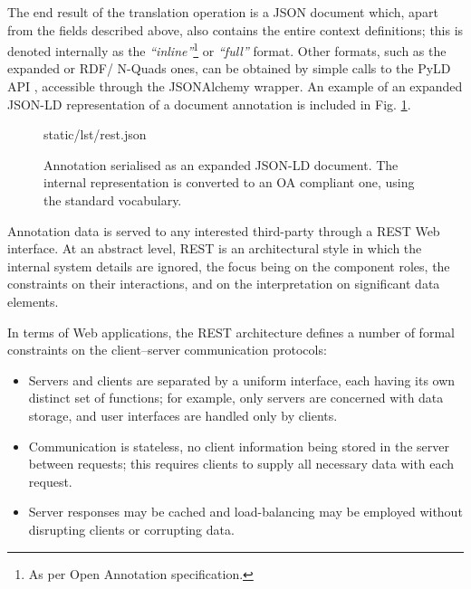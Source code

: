 The end result of the translation operation is a JSON document which, apart
from the fields described above, also contains the entire context definitions;
this is denoted internally as the \textit{``inline''}\footnote{As per Open
Annotation specification.} or \textit{``full''} format. Other formats, such
as the expanded or RDF/ N-Quads ones, can be obtained by simple calls to the
PyLD API \cite{ref:pyld}, accessible through the JSONAlchemy wrapper. An example
of an expanded JSON-LD representation of a document annotation is included in
Fig.  \ref{lst:annojson}.

\begin{figure}[!ht]
  
    {static/lst/rest.json}
    \caption[Annotation serialised as an expanded JSON-LD document]
            {Annotation serialised as an expanded JSON-LD document. The internal
             representation is converted to an OA compliant one, using the
             standard vocabulary.}
    \label{lst:annojson}
\end{figure}

Annotation data is served to any interested third-party through a REST Web
interface. At an abstract level, REST is an architectural style in which the
internal system details are ignored, the focus being on the component roles,
the constraints on their interactions, and on the interpretation on significant
data elements.

In terms of Web applications, the REST architecture defines a number of formal
constraints on the client--server communication protocols:
\begin{itemize}
  \item Servers and clients are separated by a uniform interface, each having
        its own distinct set of functions; for example, only servers are
        concerned with data storage, and user interfaces are handled only by
        clients.
  \item Communication is stateless, no client information being stored in the
        server between requests; this requires clients to supply all necessary
        data with each request.
  \item Server responses may be cached and load-balancing may be employed
        without disrupting clients or corrupting data.
\end{itemize}

